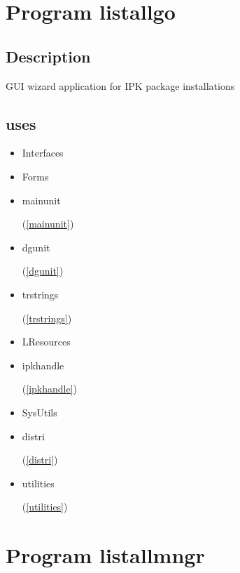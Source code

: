 \documentclass{report}
\begin{document}
\chapter{Program listallgo}
\label{listallgo}
\section{Description}
GUI wizard application for IPK package installations
\section{uses}
\begin{itemize}
\item \begin{ttfamily}Interfaces\end{ttfamily}\item \begin{ttfamily}Forms\end{ttfamily}\item \begin{ttfamily}mainunit\end{ttfamily}(\ref{mainunit})\item \begin{ttfamily}dgunit\end{ttfamily}(\ref{dgunit})\item \begin{ttfamily}trstrings\end{ttfamily}(\ref{trstrings})\item \begin{ttfamily}LResources\end{ttfamily}\item \begin{ttfamily}ipkhandle\end{ttfamily}(\ref{ipkhandle})\item \begin{ttfamily}SysUtils\end{ttfamily}\item \begin{ttfamily}distri\end{ttfamily}(\ref{distri})\item \begin{ttfamily}utilities\end{ttfamily}(\ref{utilities})\end{itemize}
\chapter{Program listallmngr}
\label{listallmngr}
\end{document}
